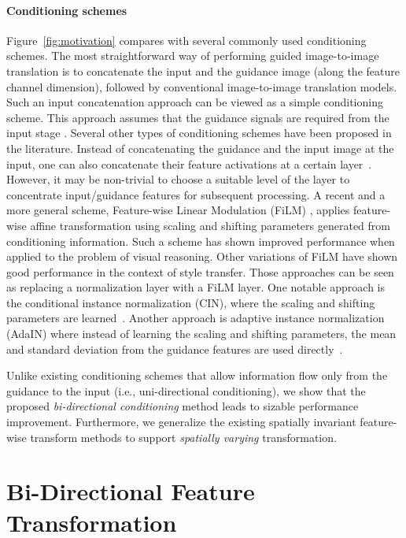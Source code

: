 \documentclass[10pt,twocolumn,letterpaper]{article}
\newlength\secmargin
\newcommand{\figref}[1]{Figure~\ref{fig:#1}}
\begin{document}
\paragraph{Conditioning schemes}
\figref{motivation} compares with several commonly used conditioning schemes. The most straightforward way of performing guided image-to-image translation is to concatenate the input and the guidance image (along the feature channel dimension), followed by conventional image-to-image translation models. 
Such an input concatenation approach can be viewed as a simple conditioning scheme.
This approach assumes that the guidance signals are required from the input stage \cite{yu2018free,zhang2017real,xian2018texturegan}.
Several other types of conditioning schemes have been proposed in the literature.
Instead of concatenating the guidance and the input image at the input, one can also concatenate their feature activations at a certain layer~\cite{li2017joint,lai2018learning}. 
However, it may be non-trivial to choose a suitable level of the layer to concentrate input/guidance features for subsequent processing.
A recent and a more general scheme, Feature-wise Linear Modulation (FiLM) \cite{perez2018film}, applies feature-wise affine transformation using scaling and shifting parameters generated from conditioning information. 
Such a scheme has shown improved performance when applied to the problem of visual reasoning. Other variations of FiLM have shown good performance in the context of style transfer. Those approaches can be seen as replacing a normalization layer with a FiLM layer. One notable approach is the conditional instance normalization (CIN), where the scaling and shifting parameters are learned~\cite{dumoulin2017learned}. Another approach is adaptive instance normalization (AdaIN) where instead of learning the scaling and shifting parameters, the mean and standard deviation from the guidance features are used directly~\cite{huang2017arbitrary}.

Unlike existing conditioning schemes that allow information flow only from the guidance to the input (i.e., uni-directional conditioning), we show that the proposed \emph{bi-directional conditioning} method leads to sizable performance improvement. Furthermore, we generalize the existing spatially invariant feature-wise transform methods to support \emph{spatially varying} transformation.
 \vspace{\secmargin}
\section{Bi-Directional Feature Transformation}
\label{sec:method}
\end{document}
